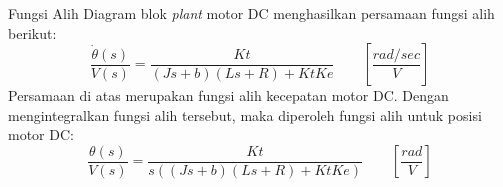 \documentclass [xcolor={dvipsnames}, t] {beamer}
\begin{document}
\begin{frame}{Fungsi Alih}
	Diagram blok \textit{plant} motor DC menghasilkan persamaan fungsi alih berikut:
	\begin{equation}
		\frac{\dot{\theta}(s)}{V(s)}=\frac{Kt}{(Js+b)(Ls+R)+KtKe} \qquad \left[\frac{rad/sec}{V}\right] 
	\end{equation} 
	Persamaan di atas merupakan fungsi alih kecepatan motor DC. Dengan mengintegralkan fungsi alih tersebut, maka diperoleh fungsi alih untuk posisi motor DC:
	\begin{equation}
		\frac{\theta(s)}{V(s)}=\frac{Kt}{s((Js+b)(Ls+R)+KtKe)} \qquad \left[\frac{rad}{V}\right]
		\label{position}
	\end{equation}
\end{frame}
\end{document}
